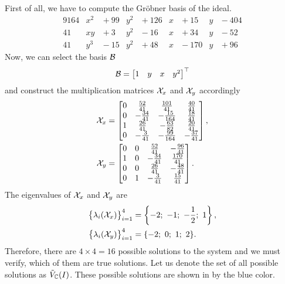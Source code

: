 \begin{example}
  First of all, we have to compute the Gr\"obner basis of the ideal.
  \begin{alignat}{9}
    164 & x^2 & {}+{}99 & y^2 & {}+{}126 & x & {}+{}15  & y & {}-{}404\\
    41  & xy  & {}+{}3  & y^2 & {}-{}16  & x & {}+{}34  & y & {}-{}52 \\
    41  & y^3 & {}-{}15 & y^2 & {}+{}48  & x & {}-{}170 & y & {}+{}96
  \end{alignat}
  Now, we can select the basis $\mathcal{B}$
  \begin{align}
    \mathcal{B} = \begin{bmatrix} 1 & y & x & y^2 \end{bmatrix}^\top
  \end{align}
  and construct the multiplication matrices $\mathcal{X}_x$ and $\mathcal{X}_y$ accordingly
  \begin{align}
    \mathcal{X}_x &= \begin{bmatrix} 0 & \frac{52}{41} & \frac{101}{41} & \frac{40}{41}\\
                  0 & -\frac{34}{41} & -\frac{15}{164} & \frac{18}{41}\\
                  1 & \frac{26}{41} & -\frac{63}{82} & \frac{20}{41}\\
                  0 & -\frac{3}{41} & -\frac{99}{164} & -\frac{37}{41}\end{bmatrix},\\
    \mathcal{X}_y &= \begin{bmatrix} 0 & 0 & \frac{52}{41} & -\frac{96}{41}\\
                  1 & 0 & -\frac{34}{41} & \frac{170}{41}\\
                  0 & 0 & \frac{26}{41} & -\frac{48}{41}\\
                  0 & 1 & -\frac{3}{41} & \frac{15}{41}\end{bmatrix}.
  \end{align}
  The eigenvalues of $\mathcal{X}_x$ and $\mathcal{X}_y$ are
  \begin{align}
    \big\{\lambda_i(\MM_x)\big\}_{i=1}^4 &= \left\{-2;\ -1;\ -\frac{1}{2};\ 1\right\},\\
    \big\{\lambda_i(\MM_y)\big\}_{i=1}^4 &= \{-2;\ 0;\ 1;\ 2\}.
  \end{align}
  Therefore, there are $4\times4=16$ possible solutions to the system and we must verify, which of them are true solutions.
  Let us denote the set of all possible solutions as $\tilde{V}_{\mathbb{C}}(I)$.
  These possible solutions are shown in  by the blue color.


\end{example}

